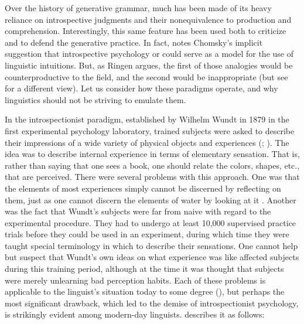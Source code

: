 \noindent 
Over the history of generative grammar, much has been made of its heavy reliance on introspective judgments and their nonequivalence to production and comprehension. Interestingly, this same feature has been used both to criticize and to defend the generative practice. In fact, \citet{Ringen1977} notes Chomsky's implicit suggestion that introspective psychology or  could serve as a model for the use of linguistic intuitions. But, as Ringen argues, the first of those analogies would be counterproductive to the field, and the second would be inappropriate (but see \citet[6\textendash{}7]{Cowart1997} for a different view). Let
us consider how these paradigms operate, and why linguistics should not be striving to emulate them.

In the introspectionist paradigm, established by Wilhelm Wundt in 1879 in the first experimental psychology laboratory, trained subjects were asked to describe their impressions of a wide variety of physical objects and experiences (\citet{Wundt1896}; \citet{Boring1953}). The idea was to describe internal experience in terms of elementary sensation. That is, rather than saying that one sees a book, one should relate the colors, shapes, etc., that are perceived. There were several problems with this approach. One was that the elements of most experiences simply cannot be discerned by reflecting on them, just as one cannot discern the elements of water by looking at it \citep{Dellarosa1988}. Another was the fact that Wundt's subjects were far from naive with regard to the experimental procedure. They had to undergo at least 10,000 supervised practice trials before they could be used in an experiment, during which time they were taught special terminology in which to describe their sensations. One cannot help but suspect that Wundt's own ideas on what experience was like affected subjects during this training period, although at the time it was thought that subjects were merely unlearning bad perception habits. Each of these problems is applicable to the linguist's situation today to some degree (\citet[vol. 3]{Levelt1974}), but perhaps the most significant drawback, which led to the
demise of introspectionist psychology, is strikingly evident among modern-day linguists. \citet{Dellarosa1988} describes it as follows:

